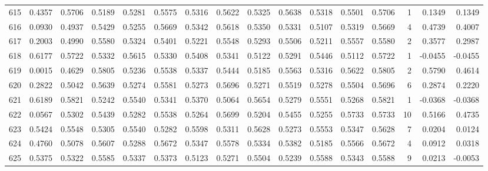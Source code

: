 \begin{tabular}{lrrrrrrrrrrrrrrr}
615 &      0.4357 &  0.5706 &  0.5189 &  0.5281 &  0.5575 &  0.5316 &  0.5622 &  0.5325 &  0.5638 &  0.5318 &   0.5501 &     0.5706 &      1 &                    0.1349 &                     0.1349 \\
616 &      0.0930 &  0.4937 &  0.5429 &  0.5255 &  0.5669 &  0.5342 &  0.5618 &  0.5350 &  0.5331 &  0.5107 &   0.5319 &     0.5669 &      4 &                    0.4739 &                     0.4007 \\
617 &      0.2003 &  0.4990 &  0.5580 &  0.5324 &  0.5401 &  0.5221 &  0.5548 &  0.5293 &  0.5506 &  0.5211 &   0.5557 &     0.5580 &      2 &                    0.3577 &                     0.2987 \\
618 &      0.6177 &  0.5722 &  0.5332 &  0.5615 &  0.5330 &  0.5408 &  0.5341 &  0.5122 &  0.5291 &  0.5446 &   0.5112 &     0.5722 &      1 &                   -0.0455 &                    -0.0455 \\
619 &      0.0015 &  0.4629 &  0.5805 &  0.5236 &  0.5538 &  0.5337 &  0.5444 &  0.5185 &  0.5563 &  0.5316 &   0.5622 &     0.5805 &      2 &                    0.5790 &                     0.4614 \\
620 &      0.2822 &  0.5042 &  0.5639 &  0.5274 &  0.5581 &  0.5273 &  0.5696 &  0.5271 &  0.5519 &  0.5278 &   0.5504 &     0.5696 &      6 &                    0.2874 &                     0.2220 \\
621 &      0.6189 &  0.5821 &  0.5242 &  0.5540 &  0.5341 &  0.5370 &  0.5064 &  0.5654 &  0.5279 &  0.5551 &   0.5268 &     0.5821 &      1 &                   -0.0368 &                    -0.0368 \\
622 &      0.0567 &  0.5302 &  0.5439 &  0.5282 &  0.5538 &  0.5264 &  0.5699 &  0.5204 &  0.5455 &  0.5255 &   0.5733 &     0.5733 &     10 &                    0.5166 &                     0.4735 \\
623 &      0.5424 &  0.5548 &  0.5305 &  0.5540 &  0.5282 &  0.5598 &  0.5311 &  0.5628 &  0.5273 &  0.5553 &   0.5347 &     0.5628 &      7 &                    0.0204 &                     0.0124 \\
624 &      0.4760 &  0.5078 &  0.5607 &  0.5288 &  0.5672 &  0.5347 &  0.5578 &  0.5334 &  0.5382 &  0.5185 &   0.5566 &     0.5672 &      4 &                    0.0912 &                     0.0318 \\
625 &      0.5375 &  0.5322 &  0.5585 &  0.5337 &  0.5373 &  0.5123 &  0.5271 &  0.5504 &  0.5239 &  0.5588 &   0.5343 &     0.5588 &      9 &                    0.0213 &                    -0.0053 \\

\end{tabular}
